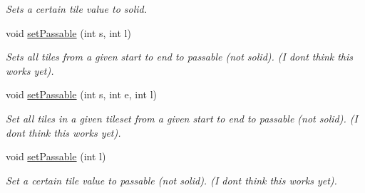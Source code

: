 \begin{DoxyCompactItemize}
\begin{DoxyCompactList}\small\item\em Sets a certain tile value to solid. \end{DoxyCompactList}\item 
void \hyperlink{classTileset_a9daba755264c94a3ef853078757257df}{set\+Passable} (int s, int l)\hypertarget{classTileset_a9daba755264c94a3ef853078757257df}{}\label{classTileset_a9daba755264c94a3ef853078757257df}

\begin{DoxyCompactList}\small\item\em Sets all tiles from a given start to end to passable (not solid). (I don\textquotesingle{}t think this works yet). \end{DoxyCompactList}\item 
void \hyperlink{classTileset_aec937b8a59ca974a5218d701306fd131}{set\+Passable} (int s, int e, int l)\hypertarget{classTileset_aec937b8a59ca974a5218d701306fd131}{}\label{classTileset_aec937b8a59ca974a5218d701306fd131}

\begin{DoxyCompactList}\small\item\em Set all tiles in a given tileset from a given start to end to passable (not solid). (I don\textquotesingle{}t think this works yet). \end{DoxyCompactList}\item 
void \hyperlink{classTileset_a8bf20786d91f89d46e0aca5667a79164}{set\+Passable} (int l)\hypertarget{classTileset_a8bf20786d91f89d46e0aca5667a79164}{}\label{classTileset_a8bf20786d91f89d46e0aca5667a79164}

\begin{DoxyCompactList}\small\item\em Set a certain tile value to passable (not solid). (I don\textquotesingle{}t think this works yet). \end{DoxyCompactList}\end{DoxyCompactItemize}
